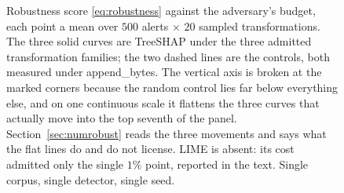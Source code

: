 \begin{figure}[t]
\begin{tikzpicture}
\end{tikzpicture}
\caption{Robustness score \eqref{eq:robustness} against the adversary's budget,
each point a mean over $500$ alerts $\times$ $20$ sampled transformations. The
three solid curves are TreeSHAP under the three admitted transformation
families; the two dashed lines are the controls, both measured under
\textsf{append\_bytes}. The vertical axis is broken at the marked corners
because the random control lies far below everything else, and on one continuous
scale it flattens the three curves that actually move into the top seventh of
the panel. Section~\ref{sec:numrobust} reads the three movements and says what
the flat lines do and do not license. LIME is absent: its cost admitted only the
single $1\%$ point, reported in the text. Single corpus, single detector, single
seed.}
\label{fig:robustness}
\end{figure}

